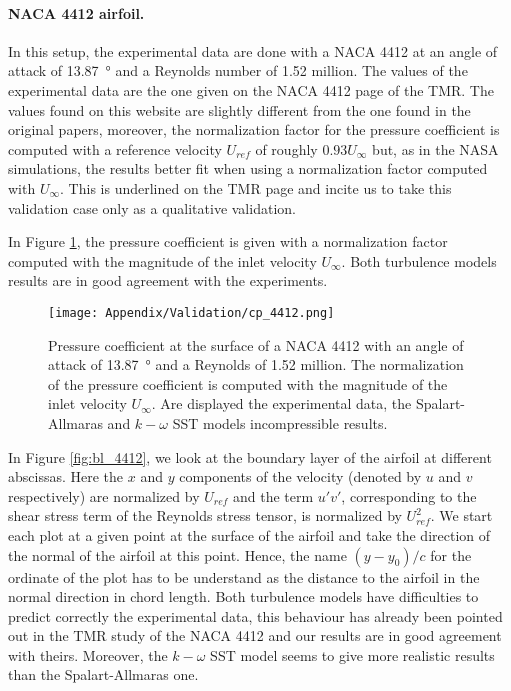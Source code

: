 \begin{subappendices}
	\paragraph{NACA 4412 airfoil.} In this setup, the experimental data \cite{NACA4412} are done with a \acrshort{NACA} 4412 at an angle of attack of \SI{13.87}{\degree} and a Reynolds number of 1.52 million. The values of the experimental data are the one given on the \acrshort{NACA} 4412 page of the \acrshort{TMR}. The values found on this website are slightly different from the one found in the original papers, moreover, the normalization factor for the pressure coefficient is computed with a reference velocity $U_{ref}$ of roughly $0.93U_\infty$ but, as in the \acrshort{NASA} simulations, the results better fit when using a normalization factor computed with $U_\infty$. This is underlined on the \acrshort{TMR} page and incite us to take this validation case only as a qualitative validation.
	
	In Figure \ref{fig:cp_4412}, the pressure coefficient is given with a normalization factor computed with the magnitude of the inlet velocity $U_\infty$. Both turbulence models results are in good agreement with the experiments. 
	\begin{figure}
		\centering
		\texttt{[image: Appendix/Validation/cp\_4412.png]}
		\caption[Pressure coefficient for a \acrshort{NACA} 4412 at \SI{13.87}{\degree}.]{Pressure coefficient at the surface of a \acrshort{NACA} 4412 with an angle of attack of \SI{13.87}{\degree} and a Reynolds of 1.52 million. The normalization of the pressure coefficient is computed with the magnitude of the inlet velocity $U_\infty$. Are displayed the experimental data, the Spalart-Allmaras and $k-\omega$ SST models incompressible results.}
		\label{fig:cp_4412}
	\end{figure}
	
	In Figure \ref{fig:bl_4412}, we look at the boundary layer of the airfoil at different abscissas. Here the $x$ and $y$ components of the velocity (denoted by $u$ and $v$ respectively) are normalized by $U_{ref}$ and the term $u'v'$, corresponding to the shear stress term of the Reynolds stress tensor, is normalized by $U_{ref}^2$. We start each plot at a given point at the surface of the airfoil and take the direction of the normal of the airfoil at this point. Hence, the name $(y - y_0)/c$ for the ordinate of the plot has to be understand as the distance to the airfoil in the normal direction in chord length. Both turbulence models have difficulties to predict correctly the experimental data, this behaviour has already been pointed out in the \acrshort{TMR} study of the \acrshort{NACA} 4412 and our results are in good agreement with theirs. Moreover, the $k-\omega$ SST model seems to give more realistic results than the Spalart-Allmaras one.
	

\end{subappendices}

